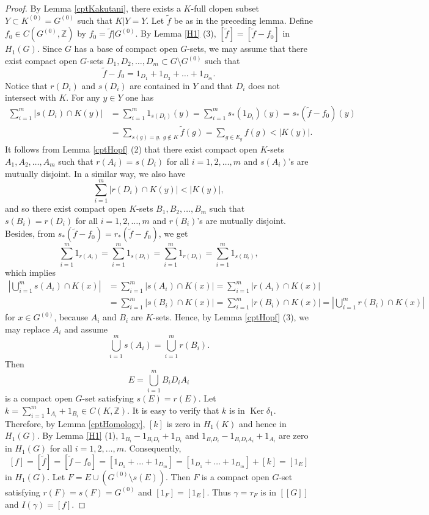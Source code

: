 \documentclass[11pt]{article}
\theoremstyle{definition}
\renewcommand{\ker}{\operatorname{Ker}}
\newcommand{\Z}{\mathbb{Z}}
\begin{document}
\begin{proof}
By Lemma \ref{cptKakutani}, 
there exists a $K$-full clopen subset $Y\subset K^{(0)}=G^{(0)}$ 
such that $K|Y=Y$. 
Let $\tilde f$ be as in the preceding lemma. 
Define $f_0\in C(G^{(0)},\Z)$ by $f_0=\tilde f|G^{(0)}$. 
By Lemma \ref{H1} (3), $[\tilde f]=[\tilde f-f_0]$ in $H_1(G)$. 
Since $G$ has a base of compact open $G$-sets, 
we may assume that there exist compact open $G$-sets 
$D_1,D_2,\dots,D_m\subset G\setminus G^{(0)}$ such that 
\[
\tilde f-f_0=1_{D_1}+1_{D_2}+\dots+1_{D_m}. 
\]
Notice that 
$r(D_i)$ and $s(D_i)$ are contained in $Y$ and 
that $D_i$ does not intersect with $K$. 
For any $y\in Y$ one has 
\begin{align*}
\sum_{i=1}^m\lvert s(D_i)\cap K(y)\rvert
&=\sum_{i=1}^m1_{s(D_i)}(y)
=\sum_{i=1}^ms_*(1_{D_i})(y)
=s_*(\tilde f-f_0)(y) \\
&=\sum_{s(g)=y,\ g\notin K}\tilde f(g)
=\sum_{g\in E_y}f(g)<\lvert K(y)\rvert. 
\end{align*}
It follows from Lemma \ref{cptHopf} (2) that 
there exist compact open $K$-sets $A_1,A_2,\dots,A_m$ such that 
$r(A_i)=s(D_i)$ for all $i=1,2,\dots,m$ and 
$s(A_i)$'s are mutually disjoint. 
In a similar way, we also have 
\[
\sum_{i=1}^m\lvert r(D_i)\cap K(y)\rvert<\lvert K(y)\rvert, 
\]
and so there exist compact open $K$-sets $B_1,B_2,\dots,B_m$ such that 
$s(B_i)=r(D_i)$ for all $i=1,2,\dots,m$ and 
$r(B_i)$'s are mutually disjoint. 
Besides, from $s_*(\tilde f-f_0)=r_*(\tilde f-f_0)$, we get 
\[
\sum_{i=1}^m1_{r(A_i)}=\sum_{i=1}^m1_{s(D_i)}
=\sum_{i=1}^m1_{r(D_i)}=\sum_{i=1}^m1_{s(B_i)}, 
\]
which implies 
\begin{align*}
\left\lvert\bigcup_{i=1}^ms(A_i)\cap K(x)\right\lvert
&=\sum_{i=1}^m\lvert s(A_i)\cap K(x)\rvert
=\sum_{i=1}^m\lvert r(A_i)\cap K(x)\rvert \\
&=\sum_{i=1}^m\lvert s(B_i)\cap K(x)\rvert
=\sum_{i=1}^m\lvert r(B_i)\cap K(x)\rvert
=\left\lvert\bigcup_{i=1}^mr(B_i)\cap K(x)\right\rvert
\end{align*}
for $x\in G^{(0)}$, because $A_i$ and $B_i$ are $K$-sets. 
Hence, by Lemma \ref{cptHopf} (3), we may replace $A_i$ and assume 
\[
\bigcup_{i=1}^ms(A_i)=\bigcup_{i=1}^mr(B_i). 
\]
Then 
\[
E=\bigcup_{i=1}^mB_iD_iA_i
\]
is a compact open $G$-set satisfying $s(E)=r(E)$. 
Let $k=\sum_{i=1}^m1_{A_i}+1_{B_i}\in C(K,\Z)$. 
It is easy to verify that $k$ is in $\ker\delta_1$. 
Therefore, by Lemma \ref{cptHomology}, 
$[k]$ is zero in $H_1(K)$ and hence in $H_1(G)$. 
By Lemma \ref{H1} (1), 
$1_{B_i}-1_{B_iD_i}+1_{D_i}$ and $1_{B_iD_i}-1_{B_iD_iA_i}+1_{A_i}$ 
are zero in $H_1(G)$ for all $i=1,2,\dots,m$. 
Consequently, 
\[
[f]=[\tilde f]=[\tilde f-f_0]=[1_{D_1}+\dots+1_{D_m}]
=[1_{D_1}+\dots+1_{D_m}]+[k]=[1_E]
\]
in $H_1(G)$. 
Let $F=E\cup(G^{(0)}\setminus s(E))$. 
Then $F$ is a compact open $G$-set 
satisfying $r(F)=s(F)=G^{(0)}$ and $[1_F]=[1_E]$. 
Thus $\gamma=\tau_F$ is in $[[G]]$ and $I(\gamma)=[f]$. 
\end{proof}
\end{document}
